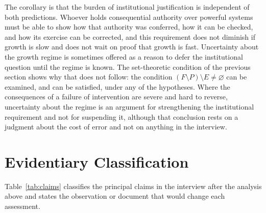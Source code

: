 \documentclass[11pt]{article}
\begin{document}
The corollary is that the burden of institutional justification is independent of both predictions. Whoever holds consequential authority over powerful systems must be able to show how that authority was conferred, how it can be checked, and how its exercise can be corrected, and this requirement does not diminish if growth is slow and does not wait on proof that growth is fast. Uncertainty about the growth regime is sometimes offered as a reason to defer the institutional question until the regime is known. The set-theoretic condition of the previous section shows why that does not follow: the condition $(F\setminus P)\setminus E\neq\varnothing$ can be examined, and can be satisfied, under any of the hypotheses. Where the consequences of a failure of intervention are severe and hard to reverse, uncertainty about the regime is an argument for strengthening the institutional requirement and not for suspending it, although that conclusion rests on a judgment about the cost of error and not on anything in the interview.

\section{Evidentiary Classification}

Table~\ref{tab:claims} classifies the principal claims in the interview after the analysis above and states the observation or document that would change each assessment.
\end{document}
